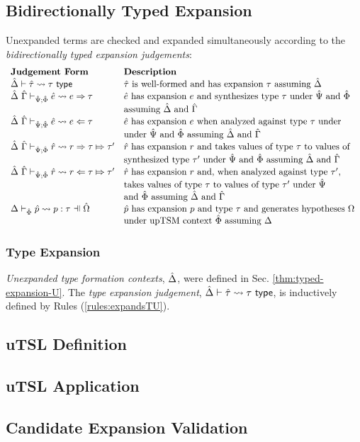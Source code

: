 \subsection{Bidirectionally Typed Expansion}
Unexpanded terms are checked and expanded simultaneously according to the \emph{bidirectionally typed expansion judgements}:
\[\begin{array}{ll}
\textbf{Judgement Form} & \textbf{Description}\\
\expandsTU{\uDelta}{\utau}{\tau} & \text{$\utau$ is well-formed and has expansion $\tau$ assuming $\uDelta$}\\
\esyn{\uDelta}{\uGamma}{\uPsi}{\uPhi}{\ue}{e}{\tau} & \text{$\ue$ has expansion $e$ and synthesizes type $\tau$ under $\uPsi$ and $\uPhi$}\\
& \text{assuming $\uDelta$ and $\uGamma$}\\
\eana{\uDelta}{\uGamma}{\uPsi}{\uPhi}{\ue}{e}{\tau} & \text{$\ue$ has expansion $e$ when analyzed against type $\tau$ under}\\
& \text{under $\uPsi$ and $\uPhi$ assuming $\uDelta$ and $\uGamma$}\\
\rsyn{\uDelta}{\uGamma}{\uPsi}{\uPhi}{\urv}{r}{\tau}{\tau'} & \text{$\urv$ has expansion $r$ and takes values of type $\tau$ to values of}\\
& \text{synthesized type $\tau'$ under $\uPsi$ and $\uPhi$ assuming $\uDelta$ and $\uGamma$}\\
\rana{\uDelta}{\uGamma}{\uPsi}{\uPhi}{\urv}{r}{\tau}{\tau'} & \text{$\urv$ has expansion $r$ and, when analyzed against type $\tau'$, }\\
& \text{takes values of type $\tau$ to values of type $\tau'$ under $\uPsi$ }\\
& \text{and $\uPhi$ assuming $\uDelta$ and $\uGamma$}\\
\patExpands{\upctx}{\uPhi}{\upv}{p}{\tau} & \text{$\upv$ has expansion $p$ and type $\tau$ and generates hypotheses $\pctx$ }\\
& \text{under upTSM context $\uPhi$ assuming $\Delta$}
\end{array}\]

\subsubsection{Type Expansion}
\emph{Unexpanded type formation contexts}, $\hat{\Delta}$, were defined in Sec. \ref{thm:typed-expansion-U}. The \emph{type expansion judgement}, $\hat{\Delta} \vdash {\hat\tau} \leadsto \tau~\mathsf{type}$, is inductively defined by Rules (\ref{rules:expandsTU}).

\subsection{uTSL Definition}
\subsection{uTSL Application}
\subsection{Candidate Expansion Validation}
